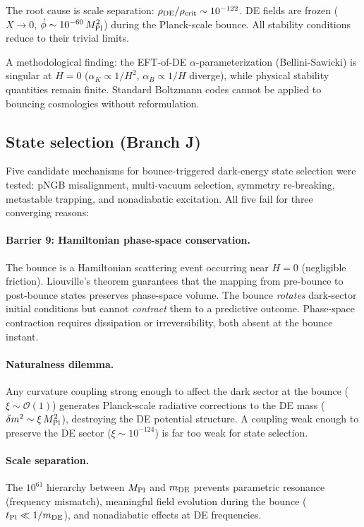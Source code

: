 \documentclass[aps,prd,twocolumn,superscriptaddress,showpacs,preprintnumbers,
  nofootinbib,longbibliography,floatfix]{revtex4-2}
\newcommand{\rhocrit}{\rho_{\rm crit}}
\newcommand{\MPl}{M_{\rm Pl}}
\begin{document}
The root cause is scale separation: $\rho_{\rm DE}/\rhocrit \sim
10^{-122}$. DE fields are frozen ($X \to 0$, $\dot\phi \sim 10^{-60}\,
\MPl^2$) during the Planck-scale bounce. All stability conditions reduce
to their trivial limits.

A methodological finding: the EFT-of-DE $\alpha$-parameterization
(Bellini-Sawicki) is singular at $H=0$ ($\alpha_K \propto 1/H^2$,
$\alpha_B \propto 1/H$ diverge), while physical stability quantities
remain finite. Standard Boltzmann codes cannot be applied to bouncing
cosmologies without reformulation.

\subsection{State selection (Branch J)}\label{sec:state}

Five candidate mechanisms for bounce-triggered dark-energy state selection
were tested: pNGB misalignment, multi-vacuum selection, symmetry
re-breaking, metastable trapping, and nonadiabatic excitation. All five
fail for three converging reasons:

\paragraph{Barrier 9: Hamiltonian phase-space conservation.}
The bounce is a Hamiltonian scattering event occurring near $H=0$
(negligible friction). Liouville's theorem guarantees that the mapping
from pre-bounce to post-bounce states preserves phase-space volume. The
bounce \textit{rotates} dark-sector initial conditions but cannot
\textit{contract} them to a predictive outcome. Phase-space contraction
requires dissipation or irreversibility, both absent at the bounce
instant.

\paragraph{Naturalness dilemma.}
Any curvature coupling strong enough to affect the dark sector at the
bounce ($\xi \sim \mathcal{O}(1)$) generates Planck-scale radiative
corrections to the DE mass ($\delta m^2 \sim \xi\,\MPl^2$), destroying
the DE potential structure. A coupling weak enough to preserve the DE
sector ($\xi \sim 10^{-124}$) is far too weak for state selection.

\paragraph{Scale separation.}
The $10^{61}$ hierarchy between $\MPl$ and $m_{\rm DE}$ prevents
parametric resonance (frequency mismatch), meaningful field evolution
during the bounce ($t_{\rm Pl} \ll 1/m_{\rm DE}$), and nonadiabatic
effects at DE frequencies.
\end{document}
